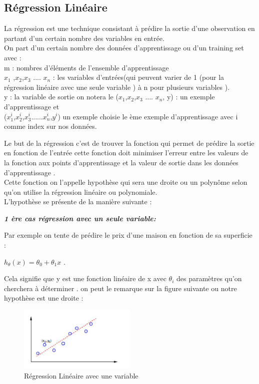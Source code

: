  \subsection{Régression Linéaire }
La régression est une technique consistant à prédire la sortie  d'une    observation en partant d'un certain nombre des variables  en entrée.\\
On part d'un certain nombre des données  d'apprentissage ou  d'un training set 
avec : \\
m :  nombres d'éléments de l'ensemble d'apprentissage \\
${x}_{1}$ ,${x}_{2}$,${x}_{3}$ .... ${x}_{n}$ : les variables d'entrées(qui peuvent varier de 1 (pour la régression linéaire avec une seule variable ) à n pour plusieurs variables  ).\\
y : la variable  de sortie 
on notera le (${x}_{1}$,${x}_{2}$,${x}_{3}$ .... ${x}_{n}$, y) : un exemple d'apprentissage
et\\
(${x}_{1}^{i}$,${x}_{2}^{i}$,${x}_{3}^{i}$......${x}_{n}^{i}$,${y}^{i}$)  un exemple choisie le ème exemple d'apprentissage avec  i comme index sur nos données.

Le but  de la régression c'est de trouver la fonction qui permet de prédire la sortie en fonction de l'entrée cette fonction doit  minimiser l'erreur entre les valeurs de la fonction aux points d'apprentissage et la valeur de sortie dans les données d'apprentissage .\\
Cette fonction on l'appelle hypothèse qui sera une droite ou un polynôme selon qu'on utilise la régression linéaire ou polynomiale. \\
L'hypothèse se présente de la manière suivante :

\textbf{\emph{1 ère cas régression avec un seule variable: }} 

Par exemple on tente de prédire le prix d'une maison en fonction de sa superficie : 

${h}_{\theta}\left(x\right)={\theta }_{0}+{\theta }_{1}x$ .

Cela signifie que  y est une fonction linéaire de x avec ${\theta }_{i}$ des paramètres qu'on cherchera à déterminer .
on peut le remarque sur la figure suivante ou notre hypothèse est une droite :
\begin{figure}[ht]
	\centering
	\includegraphics[width=0.5\textwidth]{fig/regressionLineaire1var.png}
	\caption{Régression Linéaire avec une variable}
	\label{fig:image1}
\end{figure}

